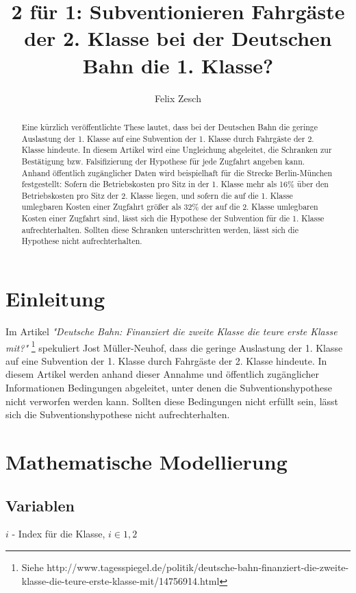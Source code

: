 \documentclass[a4paper,12pt]{article}
\title{2 für 1: Subventionieren Fahrgäste der 2. Klasse bei der Deutschen Bahn die 1. Klasse?}
\author{Felix Zesch}
\begin{document}
\maketitle

\begin{abstract}
Eine kürzlich veröffentlichte These lautet, dass bei der Deutschen Bahn die geringe Auslastung der 1. Klasse auf eine Subvention der 1. Klasse durch Fahrgäste der 2. Klasse hindeute. In diesem Artikel wird eine Ungleichung abgeleitet, die Schranken zur Bestätigung bzw. Falsifizierung der Hypothese für jede Zugfahrt angeben kann. Anhand öffentlich zugänglicher Daten wird beispielhaft für die Strecke Berlin-München festgestellt: Sofern die Betriebskosten pro Sitz in der 1. Klasse mehr als 16\% über den Betriebskosten pro Sitz der 2. Klasse liegen, und sofern die auf die 1. Klasse umlegbaren Kosten einer Zugfahrt größer als 32\% der auf die 2. Klasse umlegbaren Kosten einer Zugfahrt sind, lässt sich die Hypothese der Subvention für die 1. Klasse aufrechterhalten. Sollten diese Schranken unterschritten werden, lässt sich die Hypothese nicht aufrechterhalten.
\end{abstract}

\section{Einleitung}
Im Artikel \textit{"Deutsche Bahn: Finanziert die zweite Klasse die teure erste Klasse mit?"} \footnote{Siehe http://www.tagesspiegel.de/politik/deutsche-bahn-finanziert-die-zweite-klasse-die-teure-erste-klasse-mit/14756914.html} spekuliert Jost Müller-Neuhof, dass die geringe Auslastung der 1. Klasse auf eine Subvention der 1. Klasse durch Fahrgäste der 2. Klasse hindeute. In diesem Artikel werden anhand dieser Annahme und öffentlich zugänglicher Informationen Bedingungen abgeleitet, unter denen die Subventionshypothese nicht verworfen werden kann. Sollten diese Bedingungen nicht erfüllt sein, lässt sich die Subventionshypothese nicht aufrechterhalten.

\section{Mathematische Modellierung}
\subsection{Variablen}

\quad \quad $i$ - Index für die Klasse, $i \in {1,2}$
\end{document}
